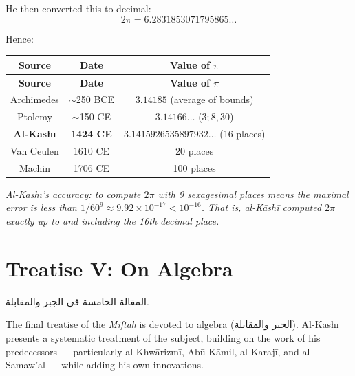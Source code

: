 \documentclass[11pt,a4paper]{article}
\newenvironment{arabicbox}{%
  \begin{framed}
  \begin{minipage}{\dimexpr\linewidth-2\fboxsep-2\fboxrule\relax}
  \setlength{\parindent}{0pt}
  \linespread{1.3}\selectfont
}{%
  \end{minipage}
  \end{framed}
}
\newcommand{\cnote}[1]{\textcolor{notecolor}{\textit{#1}}}
\newcommand{\ar}[1]{{\arabicfont\beginR #1\endR}}
\begin{document}
\noindent He then converted this to decimal:
\[
2\pi = 6.2831853071795865\ldots
\]

\noindent Hence:
\begin{center}
\fbox{$\pi = 3.1415926535897932\ldots$}
\end{center}

\begin{longtable}{|c|c|c|}
\hline
\textbf{Source} & \textbf{Date} & \textbf{Value of $\pi$} \\
\hline
\endfirsthead
\hline
\textbf{Source} & \textbf{Date} & \textbf{Value of $\pi$} \\
\hline
\endhead
Archimedes & $\sim$250 BCE & $3.14185$ (average of bounds) \\
\hline
Ptolemy & $\sim$150 CE & $3.14166\ldots$ ($3; 8, 30$) \\
\hline
\textbf{Al-K\=ash\=i} & \textbf{1424 CE} & $\mathbf{3.1415926535897932\ldots}$
(16 places) \\
\hline
Van Ceulen & 1610 CE & 20 places \\
\hline
Machin & 1706 CE & 100 places \\
\hline
\end{longtable}

\cnote{Al-K\=ash\=i's accuracy: to compute $2\pi$ with 9 sexagesimal
places means the maximal error is less than $1/60^9 \approx 9.92 \times
10^{-17} < 10^{-16}$. That is, al-K\=ash\=i computed $2\pi$ exactly up to
and including the 16th decimal place.}
\clearpage

\section{Treatise V: On Algebra}
\label{sec:treatise5}

\begin{arabicbox}
\begin{Arabic}
المقالة الخامسة في الجبر والمقابلة.
\end{Arabic}
\end{arabicbox}

\vspace{0.3cm}

\noindent The final treatise of the \textit{Mift\=ah} is devoted to algebra
(\ar{الجبر والمقابلة}). Al-K\=ash\=i presents a systematic treatment of
the subject, building on the work of his predecessors --- particularly
al-Khw\=arizm\=i, Ab\=u K\=amil, al-Karaj\=i, and al-Samaw'al --- while adding his
own innovations.
\end{document}
